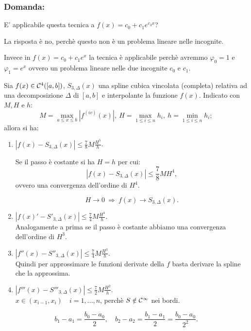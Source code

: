 \subsubsection{Domanda:}E' applicabile questa tecnica a $f(x) = c_0 +c_1
e^{c_3x}$?
\begin{flushleft}
La risposta è no, perchè questo non è un problema lineare nelle incognite.
\end{flushleft}
Invece in $f(x) = c_0 + c_1e^x$ la tecnica è applicabile perchè avremmo
$\varphi_0 = 1$ e $\varphi_1 = e^x$ ovvero un problema lineare nelle due
incognite $c_0$ e $c_1$.

\begin{teo}
Sia $f(x) \in \mathcal{C}^4([a,b])$, $S_{3,\Delta}(x)$ una spline cubica vincolata
(completa) relativa ad una decomposizione $\Delta$ di $[a,b]$ e interpolante
la funzione $f(x)$. Indicato con $M, H$ e $h$:
\[M = \max_{a \leq x \leq b} \left|f^{(iv)}(x)\right|, \ H = \max_{1 \leq i \leq n}
h_i, \ h = \min_{1 \leq i \leq n}h_i;\]
allora si ha:
\begin{enumerate}
\item $\left|f(x) - S_{3,\Delta}(x)\right| \leq \frac{7}{8}M\frac{H^5}{h}$.
\begin{osse}
Se il passo è costante si ha $H = h$ per cui:
\[\left|f(x) - S_{3,\Delta}(x)\right| \leq \frac{7}{8}MH^4,\]
ovvero una convergenza dell'ordine di $H^4$.
\end{osse}
\[H \to 0 \ \Longrightarrow \ f(x) \to S_{3,\Delta}(x).\]
\item $\left|f(x)' - S'_{3,\Delta}(x)\right| \leq \frac{7}{4}M\frac{H^4}{h}$.\\
Analogamente a prima se il passo è costante abbiamo una convergenza
dell'ordine di $H^3$.
\item $\left|f''(x) - S''_{3,\Delta}(x)\right| \leq \frac{7}{4}M\frac{H^3}{h}$.
\\
Quindi per approssimare le funzioni derivate della $f$ basta derivare la
spline che la approssima.

\item$\left|f'''(x) - S'''_{3,\Delta}(x)\right| \leq \frac{7}{2}M\frac{H^2}{h}$.
 \\ $x \in (x_{i-1}, x_i) \quad i = 1, \ldots, n$, perchè $S \notin \mathcal{C}^\infty$
nei bordi.
\end{enumerate}

\[
b_1-a_1 = \frac{b_0 - a_0}{2}, \quad b_2-a_2 = \frac{b_1-a_1}{2} =
\frac{b_0 - a_0}{2^2}.
\]
\end{teo}

